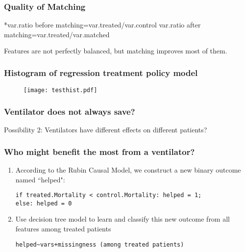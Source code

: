 \documentclass{beamer}
\begin{document}
\begin{frame}
\frametitle{Quality of Matching}
\begin{table}
\caption{MatchBalance performance of Logistic Regression Propensity Score Model}
\fontsize{3mm}{1mm}\selectfont
*var.ratio before matching=var.treated/var.control
\fontsize{3mm}{1mm}\selectfont
\newline *var.ratio after matching=var.treated/var.matched
\end{table}
\pause
Features are not perfectly balanced, but matching improves most of them.  
\end{frame}
\begin{frame}
\frametitle{Histogram of regression treatment policy model}
\begin{figure}
\texttt{[image: testhist.pdf]}
\end{figure}
\end{frame}
\begin{frame}
\frametitle{Ventilator does not always save?}
Possibility 2: Ventilators have different effects on different patients?
\end{frame}
\begin{frame}[fragile]
\frametitle{Who might benefit the most from a ventilator?}
\begin{enumerate}
\item According to the Rubin Causal Model, we construct a new binary outcome named ``helped":
\begin{verbatim}
if treated.Mortality < control.Mortality: helped = 1;
else: helped = 0
\end{verbatim}
\pause
\item Use decision tree model to learn and classify this new outcome from all features among treated patients
\begin{verbatim}
helped~vars+missingness (among treated patients)
\end{verbatim}
\end{enumerate}
\end{frame}
\end{document}
